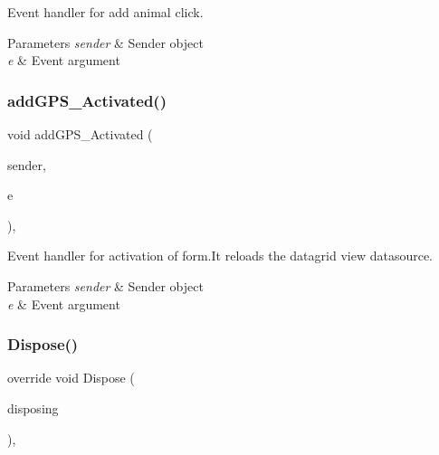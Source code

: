 Event handler for add animal click. 


\begin{DoxyParams}{Parameters}
{\em sender} & Sender object\\
\hline
{\em e} & Event argument\\
\hline
\end{DoxyParams}
\mbox{\label{classWildlifeTrackingApp_1_1Add__GPS_ad3c947935fcd0474a45348ac3a08fac4}} 
\subsubsection{\texorpdfstring{add\+G\+P\+S\+\_\+\+Activated()}{addGPS\_Activated()}}
{\footnotesize\ttfamily void add\+G\+P\+S\+\_\+\+Activated (\begin{DoxyParamCaption}\item[{object}]{sender,  }\item[{Event\+Args}]{e }\end{DoxyParamCaption})\hspace{0.3cm}{\ttfamily [inline]}, {\ttfamily [private]}}



Event handler for activation of form.\+It reloads the datagrid view datasource. 


\begin{DoxyParams}{Parameters}
{\em sender} & Sender object\\
\hline
{\em e} & Event argument\\
\hline
\end{DoxyParams}
\mbox{\label{classWildlifeTrackingApp_1_1Add__GPS_a849c3c7f8d08104f0cdb46bee9fe6389}} 
\subsubsection{\texorpdfstring{Dispose()}{Dispose()}}
{\footnotesize\ttfamily override void Dispose (\begin{DoxyParamCaption}\item[{bool}]{disposing }\end{DoxyParamCaption})\hspace{0.3cm}{\ttfamily [inline]}, {\ttfamily [protected]}}



